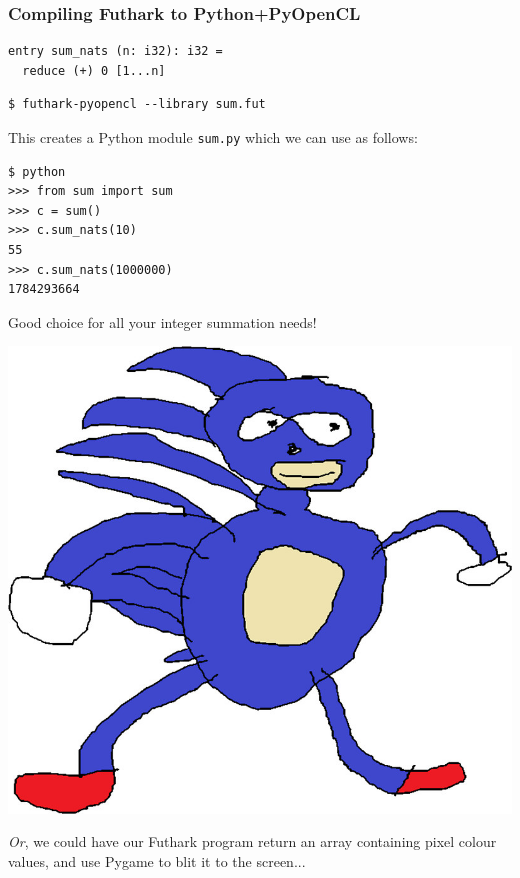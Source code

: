 \documentclass[rgb,dvipsnames]{beamer}
\begin{document}
\begin{frame}[fragile]
  \frametitle{Compiling Futhark to Python+PyOpenCL}

{\scriptsize
\begin{verbatim}
entry sum_nats (n: i32): i32 =
  reduce (+) 0 [1...n]
\end{verbatim}
}

{\scriptsize
\begin{verbatim}
$ futhark-pyopencl --library sum.fut
\end{verbatim}
}

This creates a Python module \texttt{sum.py} which we can use as follows:

\begin{minipage}{0.49\linewidth}
\begin{lstlisting}[language=none]
$ python
>>> from sum import sum
>>> c = sum()
>>> c.sum_nats(10)
55
>>> c.sum_nats(1000000)
1784293664
\end{lstlisting}

  Good choice for all your integer summation needs!
\end{minipage}\pause
\begin{minipage}{0.49\linewidth}
\includegraphics[width=\linewidth]{img/sanic.jpg}
\end{minipage}

\textit{Or}, we could have our Futhark program return an array
containing pixel colour values, and use Pygame to blit it to the
screen...

\end{frame}
\end{document}
